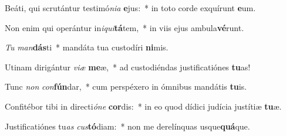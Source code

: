 \item Beáti, qui scrutántur testimó\textit{ni}\textit{a} \textbf{e}jus:~* in toto corde exquírunt \textbf{e}um.
\item Non enim qui operántur in\textit{i}\textit{qui}\textbf{tá}tem,~* in viis ejus ambula\textbf{vé}runt.
\item \textit{Tu} \textit{man}\textbf{dás}ti~* mandáta tua custodíri \textbf{ni}mis.
\item Utinam dirigántur \textit{vi}\textit{æ} \textbf{me}æ,~* ad custodiéndas justificatiónes \textbf{tu}as!
\item Tunc \textit{non} \textit{con}\textbf{fún}dar,~* cum perspéxero in ómnibus mandátis \textbf{tu}is.
\item Confitébor tibi in directi\textit{ó}\textit{ne} \textbf{cor}dis:~* in eo quod dídici judícia justítiæ \textbf{tu}æ.
\item Justificatiónes tu\textit{as} \textit{cus}\textbf{tó}diam:~* non me derelínquas usque\textbf{quá}que.
